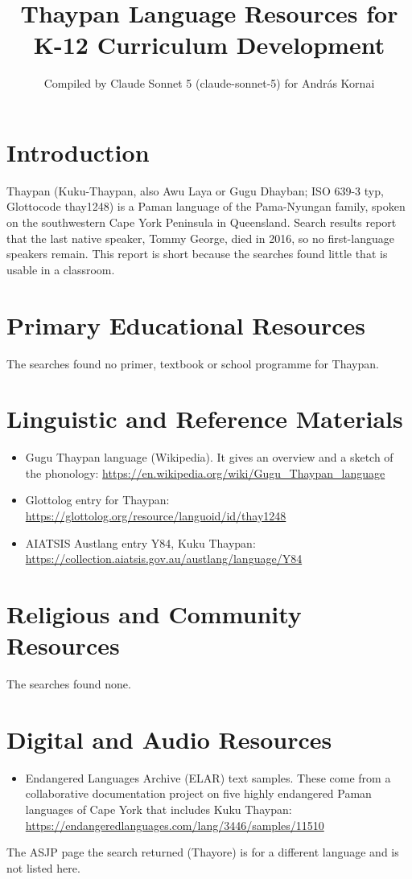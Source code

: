 \documentclass[12pt]{article}
\title{Thaypan Language Resources for K-12 Curriculum Development}
\author{Compiled by Claude Sonnet 5 (claude-sonnet-5) for Andr\'as Kornai}
\date{}
\begin{document}
\maketitle

\section{Introduction}
Thaypan (Kuku-Thaypan, also Awu Laya or Gugu Dhayban; ISO 639-3 typ, Glottocode thay1248) is a Paman language of the Pama-Nyungan family, spoken on the southwestern Cape York Peninsula in Queensland. Search results report that the last native speaker, Tommy George, died in 2016, so no first-language speakers remain. This report is short because the searches found little that is usable in a classroom.

\section{Primary Educational Resources}
The searches found no primer, textbook or school programme for Thaypan.

\section{Linguistic and Reference Materials}
\begin{itemize}
\item Gugu Thaypan language (Wikipedia). It gives an overview and a sketch of the phonology: \url{https://en.wikipedia.org/wiki/Gugu_Thaypan_language}
\item Glottolog entry for Thaypan: \url{https://glottolog.org/resource/languoid/id/thay1248}
\item AIATSIS Austlang entry Y84, Kuku Thaypan: \url{https://collection.aiatsis.gov.au/austlang/language/Y84}
\end{itemize}

\section{Religious and Community Resources}
The searches found none.

\section{Digital and Audio Resources}
\begin{itemize}
\item Endangered Languages Archive (ELAR) text samples. These come from a collaborative documentation project on five highly endangered Paman languages of Cape York that includes Kuku Thaypan: \url{https://endangeredlanguages.com/lang/3446/samples/11510}
\end{itemize}
The ASJP page the search returned (Thayore) is for a different language and is not listed here.
\end{document}
